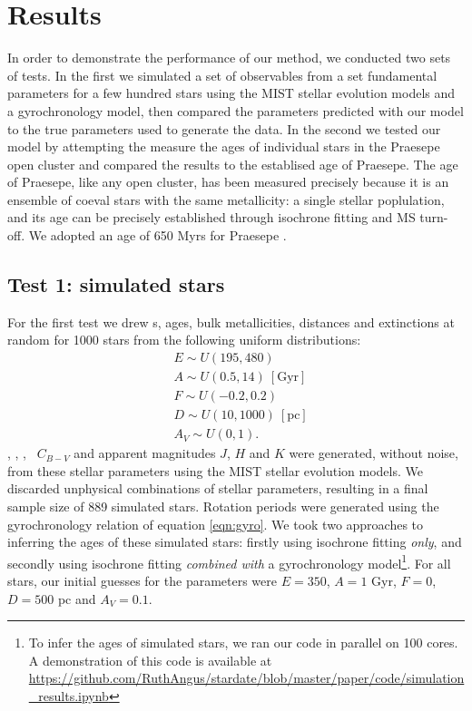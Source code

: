 \section{Results}
\label{section:results}

In order to demonstrate the performance of our method, we conducted two sets
of tests.
In the first we simulated a set of observables from a set fundamental
parameters for a few hundred stars using the MIST stellar evolution models and
a gyrochronology model, then compared the parameters predicted with our model
to the true parameters used to generate the data.
In the second we tested our model by attempting the measure the ages of
individual stars in the Praesepe open cluster and compared the results to the
establised age of Praesepe.
The age of Praesepe, like any open cluster, has been measured precisely
because it is an ensemble of coeval stars with the same metallicity: a single
stellar poplulation, and its age can be precisely established through
isochrone fitting and MS turn-off.
We adopted an age of 650 Myrs for Praesepe \citep{fossati2008}.

\subsection{Test 1: simulated stars}
For the first test we drew \eep s, ages, bulk metallicities, distances and
extinctions at random for 1000 stars from the following uniform distributions:
\begin{eqnarray}
& E \sim U(195, 480) \\
& A \sim U(0.5, 14)\mathrm{~[Gyr]} \\
& F \sim U(-0.2, 0.2) \\
& D \sim U(10, 1000)~\mathrm{[pc]} \\
& A_V \sim U(0, 1).
\end{eqnarray}
\teff, \logg, \fhat, \pmega\, $C_{B-V}$ and apparent magnitudes $J$, $H$ and
$K$ were generated, without noise, from these stellar parameters using the
MIST stellar evolution models.
We discarded unphysical combinations of stellar parameters, resulting in a
final sample size of 889 simulated stars.
Rotation periods were generated using the gyrochronology relation of
equation \ref{eqn:gyro}.
We took two approaches to inferring the ages of these simulated stars:
firstly using isochrone fitting {\it only}, and secondly using isochrone
fitting {\it combined with} a gyrochronology model\footnote{To infer the
ages of simulated stars, we ran our code in parallel on 100 cores. A
demonstration of this code is available at
\url{https://github.com/RuthAngus/stardate/blob/master/paper/code/simulation_results.ipynb}}.
For all stars, our initial guesses for the parameters were $E = 350$,
$A = 1$ Gyr, $F = 0$, $D = 500$ pc and $A_V = 0.1$.

